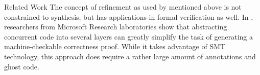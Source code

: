 \begin{paragraph}{Related Work}
The concept of refinement as used by \cite{TPHOLs1996/Butler,POPL2015/Delaware} mentioned above
is not constrained to synthesis, but has applications in formal verification
as well. In \cite{CAV2015/Hawblitzel}, researchers from Microsoft Research laboratories
show that abstracting concurrent code into several layers can greatly simplify the task of generating
a machine-checkable correctness proof.
While it takes advantage of SMT technology, this approach does require a rather
large amount of annotations and ghost code.
\end{paragraph}
